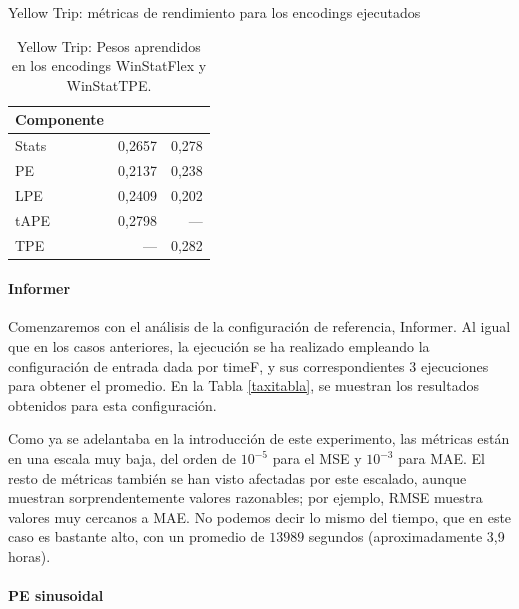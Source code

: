 \begin{landscape}
\begin{table}[H]
		\caption{Yellow Trip: métricas de rendimiento para los encodings ejecutados}
		\label{taxitabla}
		\end{table}
	
		\vspace{1cm} %
	
		\begin{table}[H]
				\centering
				\begin{tabular}{lNN}
					\toprule
					Componente &  &  \\
					\midrule
					Stats & 0,2657 & 0,278 \\
					PE    & 0,2137 & 0,238 \\
					LPE   & 0,2409 & 0,202 \\
					tAPE  & 0,2798 & —     \\
					TPE   & —      & 0,282 \\
					\bottomrule
				\end{tabular}
				\caption{Yellow Trip: Pesos aprendidos en los encodings WinStatFlex y WinStatTPE.}
				\label{taxi_pesos}
		\end{table}

	
	
\end{landscape}


\paragraph{Informer}

Comenzaremos con el análisis de la configuración de referencia, Informer. Al igual que en los casos anteriores, la ejecución se ha realizado empleando la configuración de entrada dada por timeF, y sus correspondientes 3 ejecuciones para obtener el promedio. En la Tabla \ref{taxitabla}, se muestran los resultados obtenidos para esta configuración. 

Como ya se adelantaba en la introducción de este experimento, las métricas están en una escala muy baja, del orden de $10^{-5}$ para el MSE y $10^{-3}$ para MAE. El resto de métricas también se han visto afectadas por este escalado, aunque muestran sorprendentemente valores razonables; por ejemplo, RMSE muestra valores muy cercanos a MAE. No podemos decir lo mismo del tiempo, que en este caso es bastante alto, con un promedio de $13989$ segundos (aproximadamente 3,9 horas).

\paragraph{PE sinusoidal}

